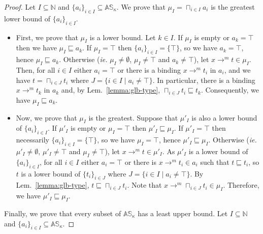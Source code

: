 \begin{proof}
  Let $I\subseteq\mathbb{N}$ and $\{a_i\}_{i\in I}\subseteq\mathbb{AS}_\kappa$.
  We prove that $\mu_I=\sqcap_{i\in I}a_i$ is the greatest lower bound of
  $\{a_i\}_{i\in I}$.
  \begin{itemize}
    \item First, we prove that $\mu_I$ is a lower bound.
    Let $k\in I$. If $\mu_I$ is empty or $a_k=\top$ then we have
    $\mu_I \sqsubseteq a_k$. If $\mu_I = \top$ then $\{a_i\}_{i\in I}=\{\top\}$,
    so we have $a_k=\top$, hence $\mu_I \sqsubseteq a_k$.
    Otherwise (\textit{ie.} $\mu_I\neq\emptyset$, $\mu_I\neq\top$ and
    $a_k\neq\top$), let $x\to^m t\in \mu_I$. Then, for all $i\in I$ either
    $a_i=\top$ or there is a binding $x\to^m t_i$ in $a_i$, and we have
    $t = \sqcap_{i\in J}t_i$ where $J=\{i\in I\mid a_i\neq\top\}$. In particular,
    there is a binding $x\to^m t_k$ in $a_k$ and, by Lem.~\ref{lemma:glb-type},
    $\sqcap_{i\in J}t_i \sqsubseteq t_k$. Consequently, we have
    $\mu_I \sqsubseteq a_k$.
    \item Now, we prove that $\mu_I$ is the greatest.
    Suppose that $\mu'_I$ is also a lower bound of $\{a_i\}_{i\in I}$.
    If $\mu'_I$ is empty or $\mu_I=\top$ then $\mu'_I \sqsubseteq \mu_I$.
    If $\mu'_I=\top$ then necessarily $\{a_i\}_{i\in I}=\{\top\}$, so
    we have $\mu_I=\top$, hence $\mu'_I \sqsubseteq \mu_I$.
    Otherwise (\textit{ie.} $\mu'_I\neq\emptyset$, $\mu'_I\neq\top$
    and $\mu_I\neq\top$),
    let $x\to^m t\in \mu'_I$. As $\mu'_I$ is a lower bound of $\{a_i\}_{i\in I}$,
    for all $i\in I$ either $a_i=\top$ or there is $x\to^m t_i\in a_i$ such
    that $t\sqsubseteq t_i$, so $t$ is a lower bound of $\{t_i\}_{i\in J}$
    where $J=\{i\in I\mid a_i\neq\top\}$. By Lem.~\ref{lemma:glb-type},
    $t\sqsubseteq \sqcap_{i\in J}t_i$. Note that
    $x\to^m \sqcap_{i\in J}t_i\in \mu_I$. Therefore, we have
    $\mu'_I \sqsubseteq \mu_I$.
  \end{itemize}

  Finally, we prove that every subset of $\mathbb{AS}_\kappa$ has a least
  upper bound. Let $I\subseteq\mathbb{N}$ and
  $\{a_i\}_{i\in I}\subseteq\mathbb{AS}_\kappa$.
\end{proof}

